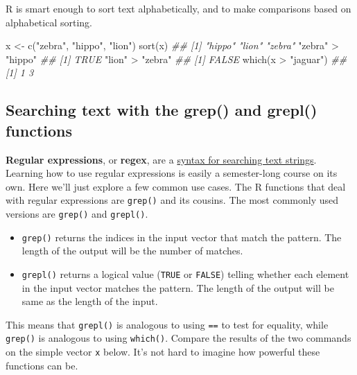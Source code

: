 \documentclass[
  13,
  letterpaper,
]{report}
\newenvironment{Shaded}{\begin{snugshade}}{\end{snugshade}}
\newcommand{\DocumentationTok}[1]{\textcolor[rgb]{0.37,0.37,0.37}{\textit{#1}}}
\newcommand{\FunctionTok}[1]{\textcolor[rgb]{0.28,0.35,0.67}{#1}}
\newcommand{\NormalTok}[1]{\textcolor[rgb]{0.00,0.23,0.31}{#1}}
\newcommand{\OtherTok}[1]{\textcolor[rgb]{0.00,0.23,0.31}{#1}}
\newcommand{\SpecialCharTok}[1]{\textcolor[rgb]{0.37,0.37,0.37}{#1}}
\newcommand{\StringTok}[1]{\textcolor[rgb]{0.13,0.47,0.30}{#1}}
\begin{document}
R is smart enough to sort text alphabetically, and to make comparisons
based on alphabetical sorting.

\begin{Shaded}
\begin{Highlighting}[]

\NormalTok{x }\OtherTok{\textless{}{-}} \FunctionTok{c}\NormalTok{(}\StringTok{"zebra"}\NormalTok{, }\StringTok{"hippo"}\NormalTok{, }\StringTok{"lion"}\NormalTok{)}
\FunctionTok{sort}\NormalTok{(x)}
\DocumentationTok{\#\# [1] "hippo" "lion"  "zebra"}
\StringTok{"zebra"} \SpecialCharTok{\textgreater{}} \StringTok{"hippo"}
\DocumentationTok{\#\# [1] TRUE}
\StringTok{"lion"} \SpecialCharTok{\textgreater{}} \StringTok{"zebra"}
\DocumentationTok{\#\# [1] FALSE}
\FunctionTok{which}\NormalTok{(x }\SpecialCharTok{\textgreater{}} \StringTok{"jaguar"}\NormalTok{)}
\DocumentationTok{\#\# [1] 1 3}
\end{Highlighting}
\end{Shaded}

\subsection{Searching text with the grep() and grepl()
functions}\label{sec-05-char-grep}

\textbf{Regular expressions}, or \textbf{regex}, are a
\href{https://en.wikipedia.org/wiki/Regular_expression}{syntax for
searching text strings}. Learning how to use regular expressions is
easily a semester-long course on its own. Here we'll just explore a few
common use cases. The R functions that deal with regular expressions are
\texttt{grep()} and its cousins. The most commonly used versions are
\texttt{grep()} and \texttt{grepl()}.

\begin{itemize}
\item
  \texttt{grep()} returns the indices in the input vector that match the
  pattern. The length of the output will be the number of matches.
\item
  \texttt{grepl()} returns a logical value (\texttt{TRUE} or
  \texttt{FALSE}) telling whether each element in the input vector
  matches the pattern. The length of the output will be same as the
  length of the input.
\end{itemize}

This means that \texttt{grepl()} is analogous to using \texttt{==} to
test for equality, while \texttt{grep()} is analogous to using
\texttt{which()}. Compare the results of the two commands on the simple
vector \texttt{x} below. It's not hard to imagine how powerful these
functions can be.
\end{document}
